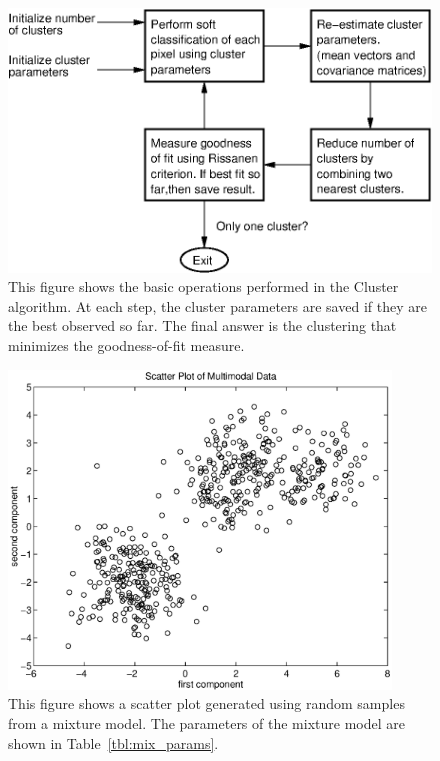 \documentclass[12pt]{article}
\begin{document}
\begin{figure}
\centerline{\includegraphics[width=4.5in]{fig3a.eps}}
\caption{This figure shows the basic operations performed in the
Cluster algorithm. At each step, the cluster parameters are saved
if they are the best observed so far. The final answer is the 
clustering that minimizes the goodness-of-fit measure.}
\label{fig:SigSet_flow_dia}
\end{figure}


\begin{figure}
\centerline{\includegraphics[width=4in]{scat_plot.eps}}
\caption{This figure shows a scatter plot generated using
random samples from a mixture model. The parameters of the 
mixture model are shown in Table~\ref{tbl:mix_params}.}
\label{fig:SigSet_scat_plot}
\end{figure}
\end{document}
